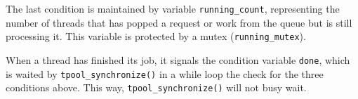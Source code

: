 \documentclass[12pt, a4paper]{article}
\begin{document}
\begin{enumerate}
    The last condition is maintained by variable \verb|running_count|,
    representing the number of threads that has popped a request or work
    from the queue but is still processing it. This variable is
    protected by a mutex (\verb|running_mutex|).

    When a thread has finished its job, it signals the condition
    variable \verb|done|, which is waited by \verb|tpool_synchronize()|
    in a while loop the check for the three conditions above.
    This way, \verb|tpool_synchronize()| will not busy wait.
  \end{enumerate}
\end{document}
